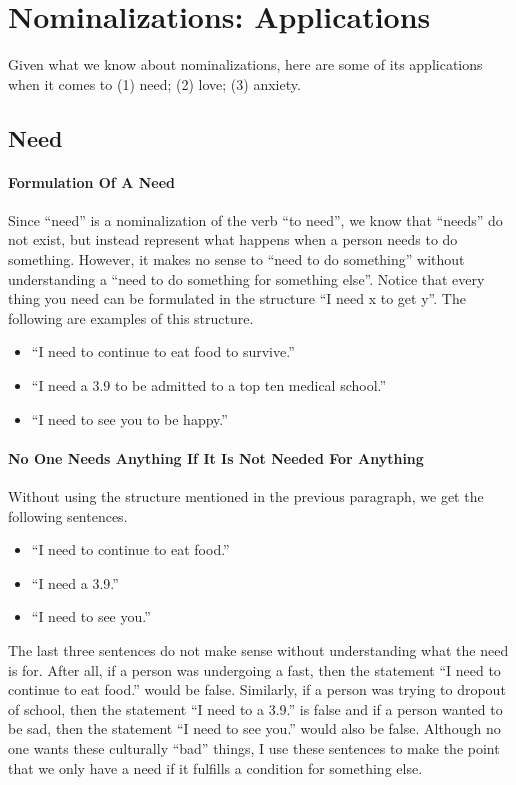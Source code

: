 \documentclass[a4paper, 12pt]{article}
\begin{document}
\section{Nominalizations: Applications}
Given what we know about nominalizations, here are some of its applications when it comes to (1) need; (2) love; (3) anxiety. \\
\subsection{Need}
\paragraph{Formulation Of A Need}
Since ``need'' is a nominalization of the verb ``to need'', we know that ``needs'' do not exist, but instead represent what happens when a person needs to do something. However, it makes no sense to ``need to do something'' without understanding a ``need to do something for something else''. Notice that every thing you need can be formulated in the structure ``I need x to get y''. The following are examples of this structure. \\
\begin{itemize}
  \item ``I need to continue to eat food to survive.''
  \item ``I need a 3.9 to be admitted to a top ten medical school.''
  \item ``I need to see you to be happy.''
\end{itemize}
\paragraph{No One Needs Anything If It Is Not Needed For Anything}
Without using the structure mentioned in the previous paragraph, we get the following sentences. \\
\begin{itemize}
  \item ``I need to continue to eat food.''
  \item ``I need a 3.9.''
  \item ``I need to see you.''
\end{itemize}
The last three sentences do not make sense without understanding what the need is for. After all, if a person was undergoing a fast, then the statement ``I need to continue to eat food.'' would be false. Similarly, if a person was trying to dropout of school, then the statement ``I need to a 3.9.'' is false and if a person wanted to be sad, then the statement ``I need to see you.'' would also be false. Although no one wants these culturally ``bad'' things, I use these sentences to make the point that we only have a need if it fulfills a condition for something else. \\
\end{document}
